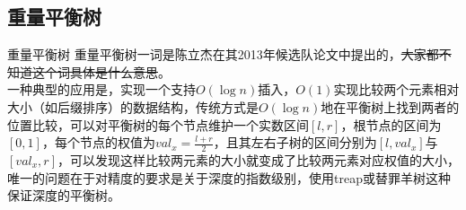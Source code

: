\documentclass{beamer}
\begin{document}
	\subsection{重量平衡树}
	\begin{frame}{重量平衡树}
		重量平衡树一词是陈立杰在其2013年候选队论文中提出的，\sout{大家都不知道这个词具体是什么意思}。\\
		
		一种典型的应用是，实现一个支持$O(\log n)$插入，$O(1)$实现比较两个元素相对大小（如后缀排序）的数据结构，传统方式是$O(\log n)$地在平衡树上找到两者的位置比较，可以对平衡树的每个节点维护一个实数区间$[l,r] $，根节点的区间为$[0,1]$，每个节点的权值为$val_x=\frac{l+r}{2}$，且其左右子树的区间分别为$[l,val_x]$与$[val_x,r]$，可以发现这样比较两元素的大小就变成了比较两元素对应权值的大小，唯一的问题在于对精度的要求是关于深度的指数级别，使用treap或替罪羊树这种保证深度的平衡树。
	\end{frame}
\end{document}
